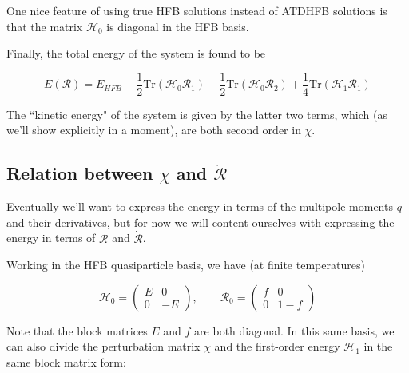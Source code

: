 One nice feature of using true HFB solutions instead of ATDHFB solutions is that the matrix $\mathcal{H}_0$ is diagonal in the HFB basis.

Finally, the total energy of the system is found to be

\begin{equation}
E(\mathcal{R}) = E_{HFB} + \frac{1}{2}\mathrm{Tr}\left(\mathcal{H}_0\mathcal{R}_1\right) + \frac{1}{2}\mathrm{Tr}\left(\mathcal{H}_0\mathcal{R}_2\right) + \frac{1}{4}\mathrm{Tr}\left(\mathcal{H}_1\mathcal{R}_1\right)
\end{equation}

\noindent The ``kinetic energy" of the system is given by the latter two terms, which (as we'll show explicitly in a moment), are both second order in $\chi$.

\subsection{Relation between $\chi$ and $\dot{\mathcal{R}}$}\label{sect:chi-rdot}

Eventually we'll want to express the energy in terms of the multipole moments $q$ and their derivatives, but for now we will content ourselves with expressing the energy in terms of $\mathcal{R}$ and $\dot{\mathcal{R}}$. %


Working in the HFB quasiparticle basis, we have (at finite temperatures)

\begin{equation}
\mathcal{H}_0 = 
\left(\begin{array}{cc}
E & 0 \\
0 & -E
\end{array}\right), 
\qquad \mathcal{R}_0 = 
\left(\begin{array}{cc}
f & 0 \\
0 & 1-f
\end{array}\right)
\end{equation}

\noindent Note that the block matrices $E$ and $f$ are both diagonal. In this same basis, we can also divide the perturbation matrix $\chi$ and the first-order energy $\mathcal{H}_1$ in the same block matrix form:

